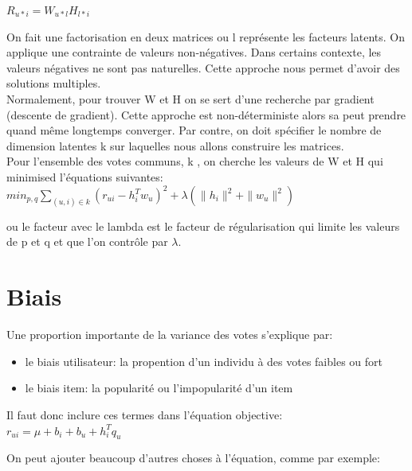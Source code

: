 \documentclass[oneside]{book}
\begin{document}
\centering
$R_{u * i} = W_{u * l} H_{l * i}$\\
\justify

On fait une factorisation en deux matrices ou l représente les facteurs latents. On applique une contrainte de valeurs non-négatives. Dans certains contexte, les valeurs négatives ne sont pas naturelles. Cette approche nous permet d'avoir des solutions multiples.\\

Normalement, pour trouver W et H on se sert d'une recherche par gradient (descente de gradient). Cette approche est non-déterministe alors sa peut prendre quand même longtemps converger. Par contre, on doit spécifier le nombre de dimension latentes k sur laquelles nous allons construire les matrices.\\

Pour l'ensemble des votes communs, k , on cherche les valeurs de W et H qui minimised l'équations suivantes:\\

\centering
$min_{p,q} \sum\limits_{(u,i)\in k} (r_{ui} - h_i^T w_u)^2 + \lambda(\parallel h_i \parallel^2 + \parallel w_u \parallel^2)$\\
\justify

ou le facteur avec le lambda est le facteur de régularisation qui limite les valeurs de p et q et que l'on contrôle par $\lambda$.
  
\section{Biais}
Une proportion importante de la variance des votes s'explique par:\\

\begin{itemize}
\item le biais utilisateur: la propention d'un individu à des votes faibles ou fort
\item le biais item: la popularité ou l'impopularité d'un item
\end{itemize}

Il faut donc inclure ces termes dans l'équation objective:\\

\centering
$r_{ui} = \mu + b_i + b_u + h_i^T q_u$\\
\justify

On peut ajouter beaucoup d'autres choses à l'équation, comme par exemple:\\
\end{document}
